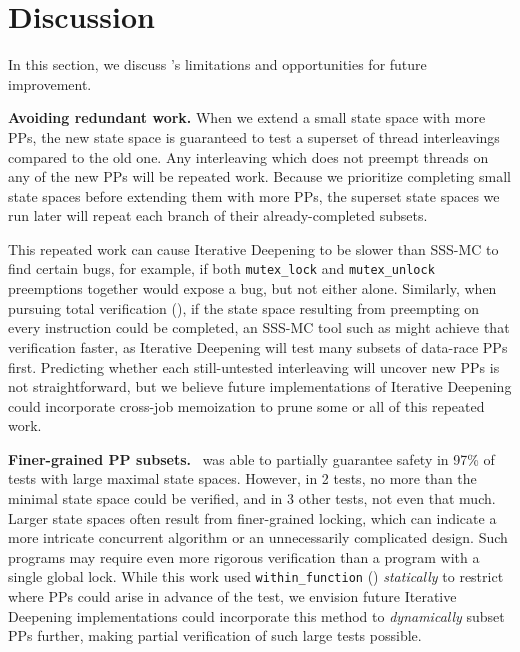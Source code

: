 \section{Discussion}
\label{sec:future}

In this section, we discuss \quicksand's limitations and opportunities for future improvement.

{\bf Avoiding redundant work.}
When we extend a small state space with more PPs, the new state space is guaranteed to test a superset of thread interleavings compared to the old one.
Any interleaving which does not preempt threads on any of the new PPs will be repeated work.
Because we prioritize completing small state spaces before extending them with more PPs,
the superset state spaces we run later will repeat each branch of their already-completed subsets.
%

This repeated work can cause Iterative Deepening to be slower than SSS-MC to find certain bugs,
for example, if both {\tt mutex\_lock} and {\tt mutex\_unlock} preemptions together would expose a bug, but not either alone.
Similarly, when pursuing total verification (\sect{\ref{sec:totalverif}}),
if the state space resulting from preempting on every instruction could be completed,
an SSS-MC tool such as \cite{spin} might achieve that verification faster,
as Iterative Deepening will test many subsets of data-race PPs first.
Predicting whether each still-untested interleaving will uncover new PPs is not straightforward,
but we believe future implementations of Iterative Deepening could incorporate cross-job memoization
to prune some or all of this repeated work.

{\bf Finer-grained PP subsets.}
\quicksand~was able to partially guarantee safety in 97\% of tests with large maximal state spaces.
However, in 2 tests, no more than the minimal state space could be verified,
and in 3 other tests, not even that much.
Larger state spaces often result from finer-grained locking,
which can indicate a more intricate concurrent algorithm or an unnecessarily complicated design.
Such programs may require even more rigorous verification than a program with a single global lock.
While this work used {\tt within\_function} (\sect{\ref{sec:landslide}}) {\em statically} to restrict where PPs could arise in advance of the test,
we envision future Iterative Deepening implementations could incorporate this method to {\em dynamically} subset PPs further,
making partial verification of such large tests possible.

